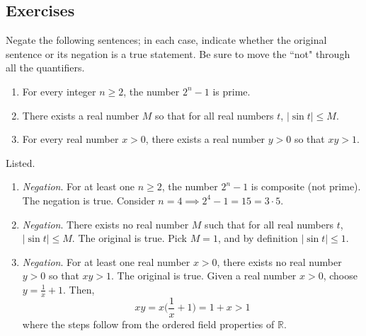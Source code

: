 \subsection{Exercises}

  \begin{exercise} 
    Negate the following sentences; in each case, indicate whether the original sentence or its negation is a true statement. Be sure to move the ``not" through all the quantifiers.
    \begin{enumerate}
      \item For every integer $n \geq 2$, the number $2^n - 1$ is prime.
      \item There exists a real number $M$ so that for all real numbers $t$, $|\sin t| \leq M$.
      \item For every real number $x > 0$, there exists a real number $y > 0$ so that $xy > 1$.
    \end{enumerate}
  \end{exercise}
  \begin{solution}
    Listed. 
    \begin{enumerate}
      \item \textit{Negation}. For at least one $n \geq 2$, the number $2^n - 1$ is composite (not prime). The negation is true. Consider $n = 4 \implies 2^4 - 1 = 15 = 3 \cdot 5$. 

      \item \textit{Negation}. There exists no real number $M$ such that for all real numbers $t$, $|\sin{t}| \leq M$. The original is true. Pick $M=1$, and by definition $|\sin{t}| \leq 1$. 

      \item \textit{Negation}. For at least one real number $x > 0$, there exists no real number $y > 0$ so that $xy > 1$. The original is true. Given a real number $x > 0$, choose $y = \frac{1}{x} + 1$. Then, 
      \begin{equation}
        xy = x \bigg( \frac{1}{x} + 1 \bigg) = 1 + x > 1
      \end{equation} 
      where the steps follow from the ordered field properties of $\mathbb{R}$. 
    \end{enumerate}
  \end{solution} 


